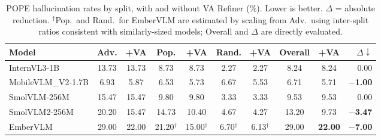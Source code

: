 \documentclass[runningheads]{llncs}
\begin{document}
\begin{table}[ht]
\centering
\caption{POPE hallucination rates by split, with and without VA Refiner (\%). Lower is better. $\Delta$ = absolute reduction. $^\dagger$Pop.\ and Rand.\ for EmberVLM are estimated by scaling from Adv.\ using inter-split ratios consistent with similarly-sized models; Overall and $\Delta$ are directly evaluated.}
\label{tab:pope}
\scriptsize
\setlength{\tabcolsep}{3pt}
\begin{tabular}{lcc|cc|cc|cc|r}
\toprule
Model & Adv. & +VA & Pop. & +VA & Rand. & +VA & Overall & +VA & $\Delta\downarrow$ \\
\midrule
InternVL3-1B       & 13.73 & 13.73 &  8.73 &  8.73 & 2.27 & 2.27 &  8.24 &  8.24 & 0.00 \\
MobileVLM\_V2-1.7B &  6.93 &  5.87 &  6.53 &  5.73 & 6.67 & 5.53 &  6.71 &  5.71 & \textbf{$-$1.00} \\
SmolVLM-256M       & 15.47 & 15.47 &  9.80 &  9.80 & 3.33 & 3.33 &  9.53 &  9.53 & 0.00 \\
SmolVLM2-256M      & 20.20 & 15.47 & 14.73 & 10.40 & 4.67 & 4.27 & 13.20 &  9.73 & \textbf{$-$3.47} \\
EmberVLM           & 29.00 & 22.00 & 21.20$^\dagger$ & 15.00$^\dagger$ & 6.70$^\dagger$ & 6.13$^\dagger$ & 29.00 & \textbf{22.00} & \textbf{$-$7.00} \\
\bottomrule
\end{tabular}
\end{table}
\end{document}
